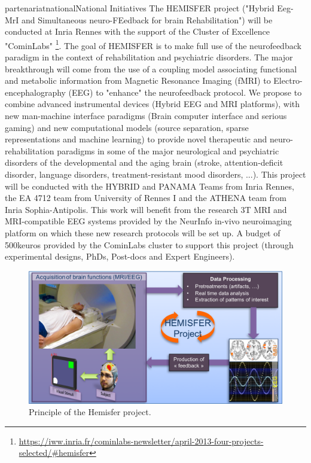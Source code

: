 \documentclass{ra2018}
\begin{document}
\begin{module}{partenariat}{national}{National Initiatives}
        The HEMISFER project ("Hybrid Eeg-MrI and Simultaneous neuro-FEedback for brain
        Rehabilitation") will be conducted at Inria Rennes with the support of the
        Cluster of Excellence "CominLabs"
        \footnote{\url{https://iww.inria.fr/cominlabs-newsletter/april-2013-four-projects-selected/\#hemisfer}}.  
         The goal of HEMISFER is to make full use of the neurofeedback paradigm in
        the context of rehabilitation and psychiatric disorders. The major breakthrough
        will come from the use of a coupling model associating functional and metabolic
        information from Magnetic Resonance Imaging (fMRI) to Electro-encephalography
        (EEG) to "enhance" the neurofeedback protocol. We propose to combine advanced
        instrumental devices (Hybrid EEG and MRI platforms), with new man-machine
        interface paradigms (Brain computer interface and serious gaming) and new
        computational models (source separation, sparse representations and machine
        learning) to provide novel therapeutic and neuro-rehabilitation paradigms in
        some of the major neurological and psychiatric disorders of the developmental
        and the aging brain (stroke, attention-deficit disorder, language disorders,
        treatment-resistant mood disorders, ...). This project will be conducted with
        the HYBRID and PANAMA Teams from Inria Rennes, the EA 4712 team from University
        of Rennes I and the ATHENA team from Inria Sophia-Antipolis. This work will
        benefit from the research 3T MRI and MRI-compatible EEG systems provided by the
        NeurInfo in-vivo neuroimaging platform on which these new research protocols
        will be set up. A budget of 500keuros provided by the CominLabs cluster
        to support this project (through experimental designs, PhDs, Post-docs and Expert Engineers).

        \begin{figure}[htbp]
          \centerline{
            \includegraphics[width=\textwidth]{IMG/Hemisfer_Principle.png}
          }
          \caption{
            Principle of the Hemisfer project.
          }
          \label{fig-hemisfer}
        \end{figure}
        

\end{module}
\end{document}
